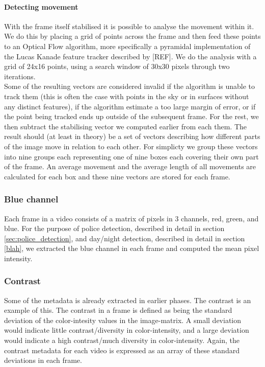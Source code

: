 \paragraph{Detecting movement}
%
With the frame itself stabilised it is possible to analyse the movement within it. We do this by placing a grid of points across the frame and then feed these points to an Optical Flow algorithm, more specifically a pyramidal implementation of the Lucas Kanade feature tracker described by [REF]. We do the analysis with a grid of 24x16 points, using a search window of 30x30 pixels through two iterations.\\%
Some of the resulting vectors are considered invalid if the algorithm is unable to track them (this is often the case with points in the sky or in surfaces without any distinct features), if the algorithm estimate a too large margin of error, or if the point being tracked ends up outside of the subsequent frame. For the rest, we then subtract the stabilising vector we computed earlier from each them. The result should (at least in theory) be a set of vectors describing how different parts of the image move in relation to each other. For simplicty we group these vectors into nine groups each representing one of nine boxes each covering their own part of the frame. An average movement and the average length of all movements are calculated for each box and these nine vectors are stored for each frame.
%
%
\subsubsection{Blue channel}\label{sec:blue_channel}
%
Each frame in a video consists of a matrix of pixels in 3 channels, red, green, and blue. For the purpose of police detection, described in detail in section \ref{sec:police_detection}, and day/night detection, described in detail in section \ref{blah}, we extracted the blue channel in each frame and computed the mean pixel intensity. 
%
\subsubsection{Contrast}
%
Some of the metadata is already extracted in earlier phases. The contrast is an example of this. The contrast in a frame is defined as being the standard deviation of the color-intesity values in the image-matrix. A small deviation would indicate little contrast/diversity in color-intensity, and a large deviation would indicate a high contrast/much diversity in color-intensity. Again, the contrast metadata for each video is expressed as an array of these standard deviations in each frame.
%
